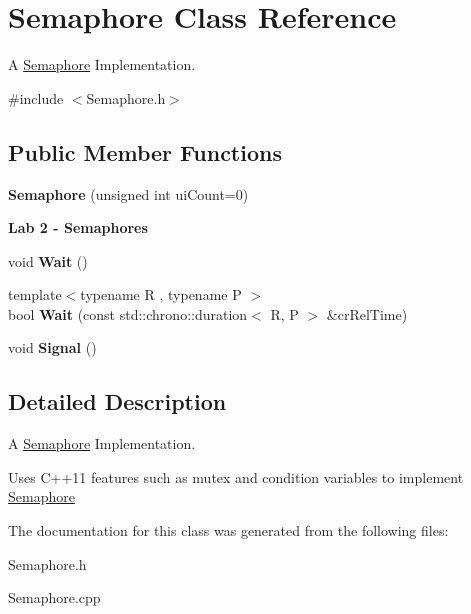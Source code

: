 \hypertarget{classSemaphore}{}\section{Semaphore Class Reference}
\label{classSemaphore}


A \hyperlink{classSemaphore}{Semaphore} Implementation.  




{\ttfamily \#include $<$Semaphore.\+h$>$}

\subsection*{Public Member Functions}
\begin{DoxyCompactItemize}
\item 
\mbox{\label{classSemaphore_a0d9290d316636875ca85d1d78950a817}} 
{\bfseries Semaphore} (unsigned int ui\+Count=0)
\end{DoxyCompactItemize}
\begin{Indent}\textbf{ Lab 2 -\/ Semaphores}\par
\begin{DoxyCompactItemize}
\item 
\mbox{\label{classSemaphore_a72aabebf026e3a8b1f3e4d0fa8ee1eda}} 
void {\bfseries Wait} ()
\item 
\mbox{\label{classSemaphore_a7f700173ae86ae623684109066e07656}} 
{\footnotesize template$<$typename R , typename P $>$ }\\bool {\bfseries Wait} (const std\+::chrono\+::duration$<$ R, P $>$ \&cr\+Rel\+Time)
\item 
\mbox{\label{classSemaphore_a86f92f738b4486439b296d8e235895f2}} 
void {\bfseries Signal} ()
\end{DoxyCompactItemize}
\end{Indent}


\subsection{Detailed Description}
A \hyperlink{classSemaphore}{Semaphore} Implementation. 

Uses C++11 features such as mutex and condition variables to implement \hyperlink{classSemaphore}{Semaphore} 

The documentation for this class was generated from the following files\+:\begin{DoxyCompactItemize}
\item 
Semaphore.\+h\item 
Semaphore.\+cpp\end{DoxyCompactItemize}
